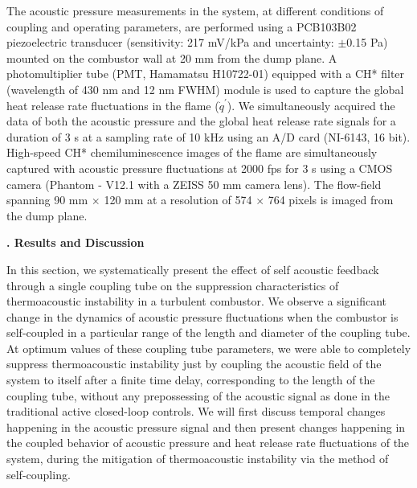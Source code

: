 \documentclass[twocolumn,10pt]{article} %
\renewcommand{\section}%
              [1]%
              {%
               \bgroup%
               \flushleft%
               \small\bf%
               \stepcounter{section}%
               \arabic{section}. #1%
               \par%
               \egroup%
              }%
\begin{document}
The acoustic pressure measurements in the system, at different conditions of coupling and operating parameters, are performed using a PCB103B02 piezoelectric transducer (sensitivity: 217 mV/kPa and uncertainty: $\pm$0.15 Pa) mounted on the combustor wall at 20 mm from the dump plane. A photomultiplier tube (PMT, Hamamatsu H10722-01) equipped with a CH* filter (wavelength of 430 nm and 12 nm FWHM) module is used to capture the global heat release rate fluctuations in the flame ($\dot{q}^\prime$). We simultaneously acquired the data of both the acoustic pressure and the global heat release rate signals for a duration of 3 s at a sampling rate of 10 kHz using an A/D card (NI-6143, 16 bit). High-speed CH* chemiluminescence images of the flame are simultaneously captured with acoustic pressure fluctuations at 2000 fps for 3 s using a CMOS camera (Phantom - V12.1 with a ZEISS 50 mm camera lens). The flow-field spanning 90 mm $\times$ 120 mm at a resolution of 574 $\times$ 764 pixels is imaged from the dump plane. 


\section{Results and Discussion} \addvspace{10pt}

In this section, we systematically present the effect of self acoustic feedback through a single coupling tube on the suppression characteristics of thermoacoustic instability in a turbulent combustor. We observe a significant change in the dynamics of acoustic pressure fluctuations when the combustor is self-coupled in a particular range of the length and diameter of the coupling tube. At optimum values of these coupling tube parameters, we were able to completely suppress thermoacoustic instability just by coupling the acoustic field of the system to itself after a finite time delay, corresponding to the length of the coupling tube, without any prepossessing of the acoustic signal as done in the traditional active closed-loop controls. We will first discuss temporal changes happening in the acoustic pressure signal and then present changes happening in the coupled behavior of acoustic pressure and heat release rate fluctuations of the system, during the mitigation of thermoacoustic instability via the method of self-coupling.  

\end{document}
